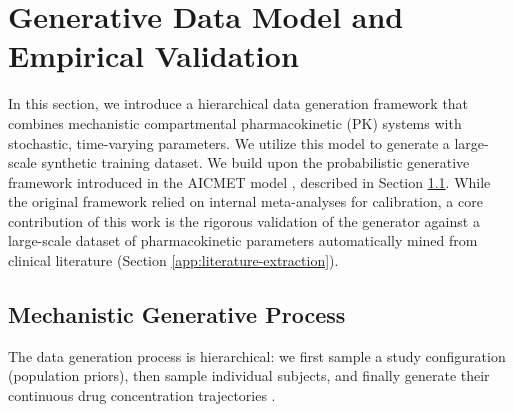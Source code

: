 \section{Generative Data Model and Empirical Validation}

In this section, we introduce a hierarchical data generation framework that combines mechanistic compartmental pharmacokinetic (PK) systems with stochastic, time-varying parameters. We utilize this model to generate a large-scale synthetic training dataset. We build upon the probabilistic generative framework introduced in the AICMET model \cite{marin2025amortized}, described in Section \ref{sec:pk-systems}. While the original framework relied on internal meta-analyses for calibration, a core contribution of this work is the rigorous validation of the generator against a large-scale dataset of pharmacokinetic parameters automatically mined from clinical literature (Section \ref{app:literature-extraction}).



\subsection{Mechanistic Generative Process}
\label{sec:pk-systems}
The data generation process is hierarchical: we first sample a study configuration (population priors), then sample individual subjects, and finally generate their continuous drug concentration trajectories .
